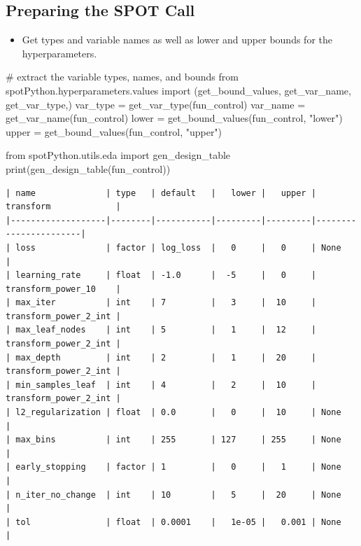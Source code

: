 \documentclass[
  letterpaper,
  DIV=11,
  numbers=noendperiod]{scrreprt}
\newenvironment{Shaded}{\begin{snugshade}}{\end{snugshade}}
\newcommand{\BuiltInTok}[1]{\textcolor[rgb]{0.00,0.23,0.31}{#1}}
\newcommand{\CommentTok}[1]{\textcolor[rgb]{0.37,0.37,0.37}{#1}}
\newcommand{\ImportTok}[1]{\textcolor[rgb]{0.00,0.46,0.62}{#1}}
\newcommand{\NormalTok}[1]{\textcolor[rgb]{0.00,0.23,0.31}{#1}}
\newcommand{\OperatorTok}[1]{\textcolor[rgb]{0.37,0.37,0.37}{#1}}
\newcommand{\StringTok}[1]{\textcolor[rgb]{0.13,0.47,0.30}{#1}}
\providecommand{\tightlist}{%
  \setlength{\itemsep}{0pt}\setlength{\parskip}{0pt}}\usepackage{longtable,booktabs,array}
\begin{document}
\hypertarget{sec-prepare-spot-call-17}{%
\subsection{Preparing the SPOT Call}\label{sec-prepare-spot-call-17}}

\begin{itemize}
\tightlist
\item
  Get types and variable names as well as lower and upper bounds for the
  hyperparameters.
\end{itemize}

\begin{Shaded}
\begin{Highlighting}[]
\CommentTok{\# extract the variable types, names, and bounds}
\ImportTok{from}\NormalTok{ spotPython.hyperparameters.values }\ImportTok{import}\NormalTok{ (get\_bound\_values,}
\NormalTok{    get\_var\_name,}
\NormalTok{    get\_var\_type,)}
\NormalTok{var\_type }\OperatorTok{=}\NormalTok{ get\_var\_type(fun\_control)}
\NormalTok{var\_name }\OperatorTok{=}\NormalTok{ get\_var\_name(fun\_control)}
\NormalTok{lower }\OperatorTok{=}\NormalTok{ get\_bound\_values(fun\_control, }\StringTok{"lower"}\NormalTok{)}
\NormalTok{upper }\OperatorTok{=}\NormalTok{ get\_bound\_values(fun\_control, }\StringTok{"upper"}\NormalTok{)}
\end{Highlighting}
\end{Shaded}

\begin{Shaded}
\begin{Highlighting}[]
\ImportTok{from}\NormalTok{ spotPython.utils.eda }\ImportTok{import}\NormalTok{ gen\_design\_table}
\BuiltInTok{print}\NormalTok{(gen\_design\_table(fun\_control))}
\end{Highlighting}
\end{Shaded}

\begin{verbatim}
| name              | type   | default   |   lower |   upper | transform             |
|-------------------|--------|-----------|---------|---------|-----------------------|
| loss              | factor | log_loss  |   0     |   0     | None                  |
| learning_rate     | float  | -1.0      |  -5     |   0     | transform_power_10    |
| max_iter          | int    | 7         |   3     |  10     | transform_power_2_int |
| max_leaf_nodes    | int    | 5         |   1     |  12     | transform_power_2_int |
| max_depth         | int    | 2         |   1     |  20     | transform_power_2_int |
| min_samples_leaf  | int    | 4         |   2     |  10     | transform_power_2_int |
| l2_regularization | float  | 0.0       |   0     |  10     | None                  |
| max_bins          | int    | 255       | 127     | 255     | None                  |
| early_stopping    | factor | 1         |   0     |   1     | None                  |
| n_iter_no_change  | int    | 10        |   5     |  20     | None                  |
| tol               | float  | 0.0001    |   1e-05 |   0.001 | None                  |
\end{verbatim}
\end{document}
